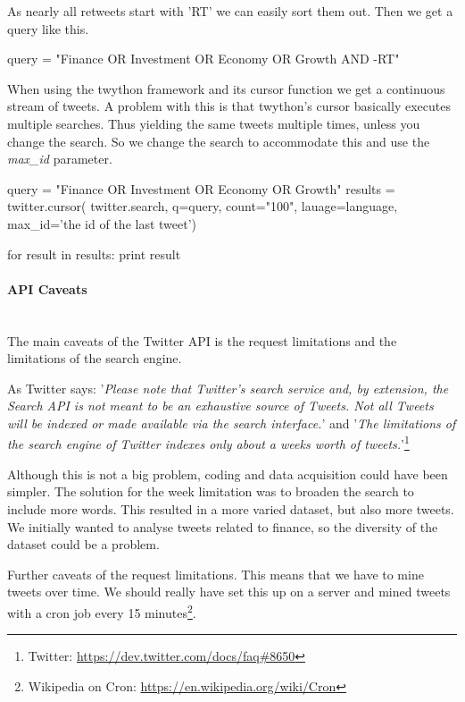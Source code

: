 As nearly all retweets start with 'RT' we can easily sort them out. Then we get
a query like this. 
\begin{python}
query = "Finance OR Investment OR Economy OR Growth AND -RT"
\end{python}

When using the twython framework and its cursor function we get a continuous
stream of tweets. A problem with this is that twython's cursor basically
executes multiple searches. Thus yielding the same tweets multiple times,
unless you change the search. So we change the search to accommodate this and
use the \textit{max\_id} parameter.
\begin{python}
query = "Finance OR Investment OR Economy OR Growth"
results = twitter.cursor(
                twitter.search,
                q=query,
                count="100",
                lauage=language,
                max_id='the id of the last tweet')

for result in results:
    print result
\end{python}
%

\paragraph{API Caveats}
\hspace{0pt}\\
The main caveats of the Twitter API is the request limitations and the
limitations of the search engine. 

As Twitter says: 
'\textit{Please note that Twitter's search service and, by extension, the Search
API is not meant to be an exhaustive source of Tweets. Not all Tweets will be
indexed or made available via the search interface.}' and 
'\textit{The limitations of the search engine of Twitter indexes only about a
weeks worth of tweets.}'\footnote{Twitter:
\url{https://dev.twitter.com/docs/faq#8650}}

Although this is not a big problem, coding and data acquisition could have been
simpler. The solution for the week limitation was to broaden the search to
include more words. This resulted in a more varied dataset, but also more
tweets. We initially wanted to analyse tweets related to finance, so the
diversity of the dataset could be a problem. 

Further caveats of the request limitations. This means that we have to mine
tweets over time. We should really have set this up on a server and mined
tweets with a cron job every 15 minutes\footnote{Wikipedia on Cron:
\url{https://en.wikipedia.org/wiki/Cron}}.
%

